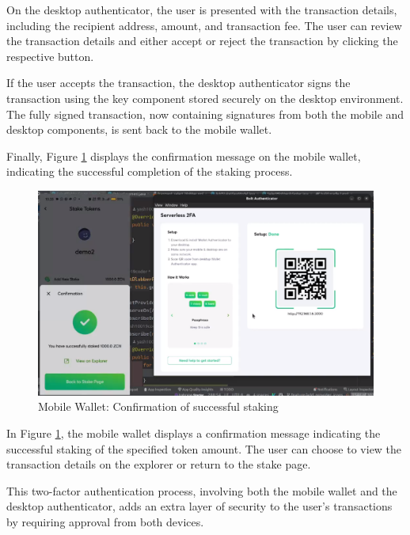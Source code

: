 On the desktop authenticator, the user is presented with the transaction details, including the recipient address, amount, and transaction fee. The user can review the transaction details and either accept or reject the transaction by clicking the respective button.

If the user accepts the transaction, the desktop authenticator signs the transaction using the key component stored securely on the desktop environment. The fully signed transaction, now containing signatures from both the mobile and desktop components, is sent back to the mobile wallet.

Finally, Figure \ref{fig:transaction_screen3} displays the confirmation message on the mobile wallet, indicating the successful completion of the staking process.

\begin{figure}[h]
    \centering
    \includegraphics[width=\textwidth]{Images/transaction_success}
    \caption{Mobile Wallet: Confirmation of successful staking}
    \label{fig:transaction_screen3}
\end{figure}

In Figure \ref{fig:transaction_screen3}, the mobile wallet displays a confirmation message indicating the successful staking of the specified token amount. The user can choose to view the transaction details on the explorer or return to the stake page.

This two-factor authentication process, involving both the mobile wallet and the desktop authenticator, adds an extra layer of security to the user's transactions by requiring approval from both devices.


